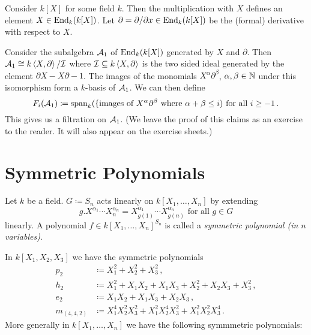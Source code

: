 \begin{example}
  Consider $k[X]$ for some field $k$.
  Then the multiplication with $X$ defines an element $X \in \operatorname{End}_k(k[X])$.
  Let $\partial = \partial/\partial x \in \operatorname{End}_k(k[X])$ be the (formal) derivative with respect to $X$.
  
  Consider the subalgebra $\mathcal{A}_1$ of $\operatorname{End}_k(k[X])$ generated by $X$ and $\partial$.
  Then $\mathcal{A}_1 \cong k\left\langle X,\partial \right\rangle/\mathcal{I}$ where $\mathcal{I} \subseteq k \left\langle X,\partial \right\rangle$ is the two sided ideal generated by the element $\partial X - X \partial - 1$.
  The images of the monomials $X^\alpha \partial^\beta$, $\alpha, \beta \in \mathbb{N}$ under this isomorphism form a $k$-basis of $\mathcal{A}_1$.
  We can then define
  \[
              F_i(\mathcal{A}_1)
    \coloneqq \operatorname{span}_k( \{\text{images of $X^\alpha \partial^\beta$ where $\alpha+\beta \leq i$})
    \text{ for all }
    i \geq -1 \,.
  \]
  This gives us a filtration on $\mathcal{A}_1$.
  (We leave the proof of this claims as an exercise to the reader. It will also appear on the exercise sheets.)
\end{example}





\section{Symmetric Polynomials}


\begin{definition}
  Let $k$ be a field.
  $G \coloneqq S_n$ acts linearly on $k[X_1, \dotsc, X_n]$ by extending
  \[
      g.X^{\alpha_1} \dotsm X_n^{\alpha_n}
    = X_{g(1)}^{\alpha_1} \dotsm X_{g(n)}^{\alpha_n}
    \text{ for all }
    g \in G
  \]
  linearly.
  A polynomial $f \in k[X_1, \dotsc, X_n]^{S_n}$ is called a \emph{symmetric polynomial (in $n$ variables)}.
\end{definition}


\begin{example}
  In $k[X_1, X_2, X_3]$ we have the symmetric polynomials
  \begin{align*}
                p_2
    &\coloneqq  X_1^2 + X_2^2 + X_3^2 \,,
    \\
                h_2
    &\coloneqq  X_1^2 + X_1 X_2 + X_1 X_3 + X_2^2 + X_2 X_3 + X_3^2 \,,
    \\
                e_2
    &\coloneqq  X_1 X_2 + X_1 X_3 + X_2 X_3 \,,
    \\
                m_{(4,4,2)}
    &\coloneqq  X_1^4 X_2^2 X_3^2 + X_1^2 X_2^4 X_3^2 + X_1^2 X_2^2 X_3^4 \,.
  \end{align*}
  More generally in $k[X_1, \dotsc, X_n]$ we have the following symmmetric polynomials:
\end{example}


